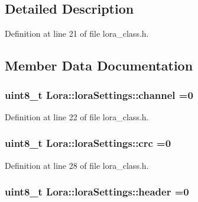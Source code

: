 \subsection{Detailed Description}


Definition at line 21 of file lora\+\_\+class.\+h.



\subsection{Member Data Documentation}
\subsubsection[{\texorpdfstring{channel}{channel}}]{\setlength{\rightskip}{0pt plus 5cm}uint8\+\_\+t Lora\+::lora\+Settings\+::channel =0}\hypertarget{struct_lora_1_1lora_settings_aea7869124f4eb6c2acfdf9bd01509839}{}\label{struct_lora_1_1lora_settings_aea7869124f4eb6c2acfdf9bd01509839}


Definition at line 22 of file lora\+\_\+class.\+h.

\subsubsection[{\texorpdfstring{crc}{crc}}]{\setlength{\rightskip}{0pt plus 5cm}uint8\+\_\+t Lora\+::lora\+Settings\+::crc =0}\hypertarget{struct_lora_1_1lora_settings_ae1637739d45abc72ee8d4d2d599d5c42}{}\label{struct_lora_1_1lora_settings_ae1637739d45abc72ee8d4d2d599d5c42}


Definition at line 28 of file lora\+\_\+class.\+h.

\subsubsection[{\texorpdfstring{header}{header}}]{\setlength{\rightskip}{0pt plus 5cm}uint8\+\_\+t Lora\+::lora\+Settings\+::header =0}\hypertarget{struct_lora_1_1lora_settings_a04610a8a79a155c273c8d7a756c818f6}{}\label{struct_lora_1_1lora_settings_a04610a8a79a155c273c8d7a756c818f6}


